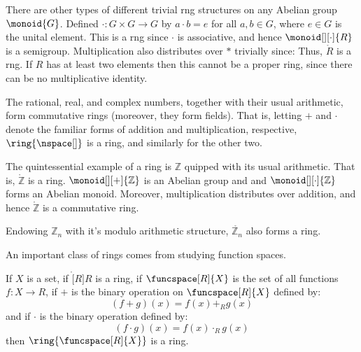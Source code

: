 \documentclass{article}                                                        %
\begin{document}
        \begin{example}
            There are other types of different trivial rng structures on any
            Abelian group $\monoid{G}$. Defined $\cdot:G\times{G}\rightarrow{G}$
            by $a\cdot{b}=e$ for all $a,b\in{G}$, where $e\in{G}$ is the unital
            element. This is a rng since $\cdot$ is associative, and hence
            $\monoid[][\cdot]{R}$ is a semigroup. Multiplication also
            distributes over $*$ trivially since:
            \vspace{-2.5ex}
            Thus, $\ring{R}$ is a rng. If $R$ has at least two elements then
            this cannot be a proper ring, since there can be no multiplicative
            identity.
        \end{example}
        \begin{example}
            The rational, real, and complex numbers, together with their usual
            arithmetic, form commutative rings (moreover, they form fields).
            That is, letting $+$ and $\cdot$ denote the familiar forms of
            addition and multiplication, respective, $\ring{\nspace[]}$ is a
            ring, and similarly for the other two.
        \end{example}
        \begin{example}
            The quintessential example of a ring is $\mathbb{Z}$ quipped with
            its usual arithmetic. That is, $\ring{\mathbb{Z}}$ is a ring.
            $\monoid[][+]{\mathbb{Z}}$ is an Abelian group and and
            $\monoid[][\cdot]{\mathbb{Z}}$ forms an Abelian monoid. Moreover,
            multiplication distributes over addition, and hence
            $\ring{\mathbb{Z}}$ is a commutative ring.
        \end{example}
        \begin{example}
            Endowing $\mathbb{Z}_{n}$ with it's modulo arithmetic structure,
            $\ring{\mathbb{Z}_{n}}$ also forms a ring.
        \end{example}
        An important class of rings comes from studying function spaces.
        \begin{theorem}
            \label{thm:Ring_of_Funcs_is_Ring}%
            If $X$ is a set, if $\ring[R]{R}$ is a ring, if
            $\funcspace[R]{X}$ is the set of all functions $f:X\rightarrow{R}$,
            if $+$ is the binary operation on $\funcspace[R]{X}$ defined by:
            \begin{equation}
                (f+g)(x)=f(x)+_{R}g(x)
            \end{equation}
            and if $\cdot$ is the binary operation defined by:
            \begin{equation}
                (f\cdot{g})(x)=f(x)\cdot_{R}g(x)
            \end{equation}
            then $\ring{\funcspace[R]{X}}$ is a ring.
        \end{theorem}
\end{document}
